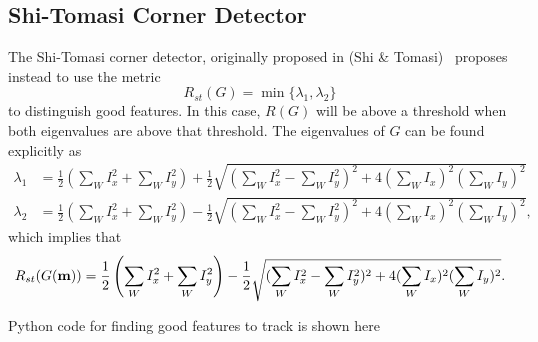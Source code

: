 \subsection{Shi-Tomasi Corner Detector}
The Shi-Tomasi corner detector, originally proposed in (Shi \& Tomasi)~\cite{ShiTomasi94} proposes instead to use the metric
\[
R_{st}(G) = \min\{\lambda_1, \lambda_2\}
\]
to distinguish good features.  In this case, $R(G)$ will be above a threshold when both eigenvalues are above that threshold.  The eigenvalues of $G$ can be found explicitly as 
\begin{align*}
\lambda_1 &= \frac{1}{2}\left(\sum_W I_x^2 + \sum_W I_y^2\right) + \frac{1}{2}\sqrt{(\sum_W I_x^2 - \sum_W I_y^2)^2+4(\sum_W I_x)^2(\sum_W I_y)^2}\\
\lambda_2 &=\frac{1}{2}\left(\sum_W I_x^2 + \sum_W I_y^2\right) - \frac{1}{2}\sqrt{(\sum_W I_x^2 - \sum_W I_y^2)^2+4(\sum_W I_x)^2(\sum_W I_y)^2},
\end{align*}
which implies that
\[
R_{st}(G(\mathbf{m})) = \frac{1}{2}\left(\sum_W I_x^2 + \sum_W I_y^2\right) - \frac{1}{2}\sqrt{(\sum_W I_x^2 - \sum_W I_y^2)^2+4(\sum_W I_x)^2(\sum_W I_y)^2}.
\]



Python code for finding good features to track is shown here~

%

















